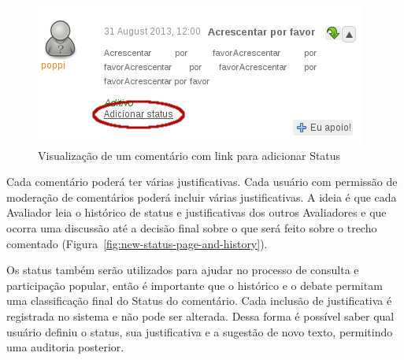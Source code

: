 \documentclass[11pt]{article}
\begin{document}
\begin{figure}[h]
\center
\includegraphics[scale=0.6]{comment-view-status.png}
\caption{Visualização de um comentário com link para adicionar Status}
\label{fig:comment-view-status}
\end{figure}

Cada comentário poderá ter várias justificativas. Cada usuário com
permissão de moderação de comentários poderá incluir várias
justificativas. A ideia é que cada Avaliador leia o histórico de
status e justificativas dos outros Avaliadores e que ocorra uma
discussão até a decisão final sobre o que será feito sobre o trecho
comentado (Figura~\ref{fig:new-status-page-and-history}).

Os status também serão utilizados para ajudar no processo de
consulta e participação popular, então é importante que o histórico e o
debate permitam uma classificação final do Status do comentário. Cada
inclusão de justificativa é registrada no sistema e não pode ser
alterada. Dessa forma é possível saber qual usuário definiu o status,
sua justificativa e a sugestão de novo texto, permitindo uma
auditoria posterior.
\end{document}

